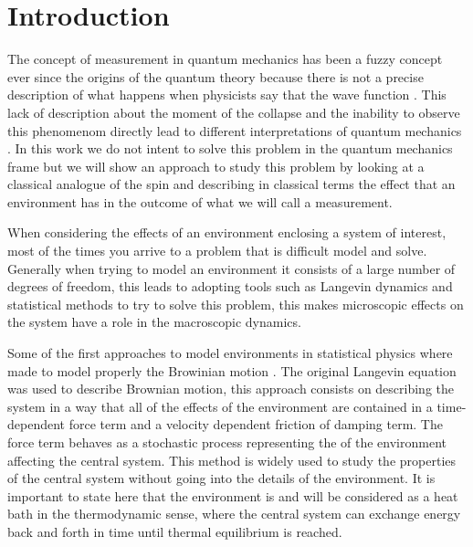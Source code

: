 \chapter{Introduction}

The concept of measurement in quantum mechanics has been a fuzzy concept ever since the origins of the quantum theory because there is not a precise description of what happens when physicists say that the wave function . This lack of description about the moment of the collapse and the inability to observe this phenomenom directly lead to different interpretations of quantum mechanics \cite{schlosshauer2005decoherence}. In this work we do not intent to solve this problem in the quantum mechanics frame but we will show an approach to study this problem by looking at a classical analogue of the spin and describing in classical terms the effect that an environment has in the outcome of what we will call a measurement. \par

When considering the effects of an environment enclosing a system of interest, most of the times you arrive to a problem that is difficult model and solve. Generally when trying to model an environment it consists of a large number of degrees of freedom, this leads to adopting tools such as Langevin dynamics and statistical methods to try to solve this problem, this makes microscopic effects on the system have a role in the macroscopic dynamics.\par 

Some of the first approaches to model environments in statistical physics where made to model properly the Browinian motion \cite{brown1828philosophical}\cite{einstein1905motion}\cite{kubo1986brownian}. The original Langevin equation \cite{langevin1908theorie} was used to describe Brownian motion, this approach consists on describing the system in a way that all of the effects of the environment are contained in a time-dependent force term and a velocity dependent friction of damping term. The force term behaves as a stochastic process representing the  of the environment affecting the central system. This method is widely used to study the properties of the central system without going into the details of the environment. It is important to state here that the environment is and will be  considered as a heat bath in the thermodynamic sense, where the central system can exchange energy back and forth in time until thermal equilibrium is reached.\par 

